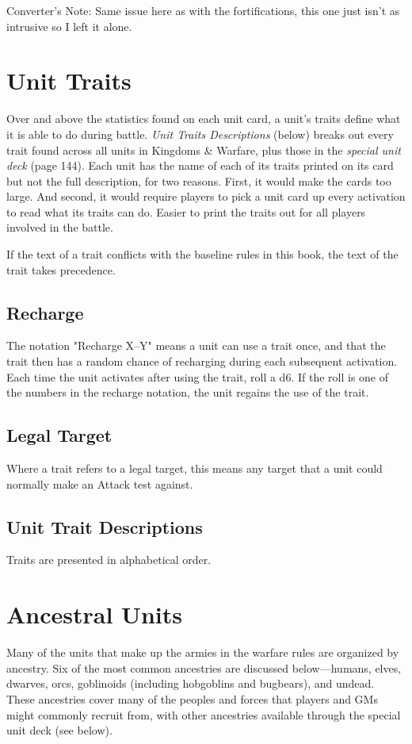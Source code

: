 \documentclass[10pt,a4paper,twoside,bg=print,twocolumn,openany,nodeprecatedcode]{dndbook}
\begin{document}
Converter's Note: Same issue here as with the fortifications, this one just isn't as intrusive so I left it alone.

\section{Unit Traits}
Over and above the statistics found on each unit card, a unit's traits define what it is able to do during battle. \textit{Unit Traits Descriptions} (below) breaks out every trait found across all units in Kingdoms \& Warfare, plus those in the \textit{special unit deck} (page 144). Each unit has the name of each of its traits printed on its card but not the full description, for two reasons. First, it would make the cards too large. And second, it would require players to pick a unit card up every activation to read what its traits can do. Easier to print the traits out for all players involved in the battle.

If the text of a trait conflicts with the baseline rules in this book, the text of the trait takes precedence.

\subsection{Recharge}
The notation "Recharge X–Y" means a unit can use a trait once, and that the trait then has a random chance of recharging during each subsequent activation. Each time the unit activates after using the trait, roll a d6. If the roll is one of the numbers in the recharge notation, the unit regains the use of the trait.

\subsection{Legal Target}
Where a trait refers to a legal target, this means any target that a unit could normally make an Attack test against.

\subsection{Unit Trait Descriptions}
Traits are presented in alphabetical order.

\section{Ancestral Units}
Many of the units that make up the armies in the warfare rules are organized by ancestry. Six of the most common ancestries are discussed below—humans, elves, dwarves, orcs, goblinoids (including hobgoblins and bugbears), and undead. These ancestries cover many of the peoples and forces that players and GMs might commonly recruit from, with other ancestries available through the special unit deck (see below).
\end{document}
